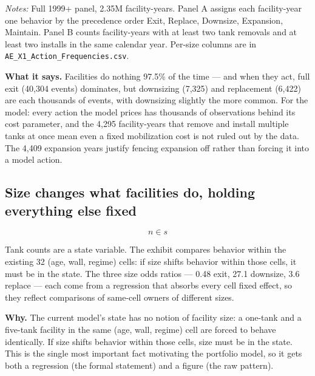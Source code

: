 \documentclass[
  letterpaper,
  DIV=11,
  numbers=noendperiod]{scrartcl}
\begin{document}
\begin{table}[H]
\centering
\caption{Facility-year behavior frequencies}

\par\vspace{4pt}
{\footnotesize\textit{Notes:} Full 1999+ panel, 2.35M facility-years. Panel A
assigns each facility-year one behavior by the precedence order Exit, Replace,
Downsize, Expansion, Maintain. Panel B counts facility-years with at least two
tank removals and at least two installs in the same calendar year. Per-size
columns are in \texttt{AE\_X1\_Action\_Frequencies.csv}.\par}
\end{table}

\textbf{What it says.} Facilities do nothing 97.5\% of the time --- and
when they act, full exit (40,304 events) dominates, but downsizing
(7,325) and replacement (6,422) are each thousands of events, with
downsizing slightly the more common. For the model: every action the
model prices has thousands of observations behind its cost parameter,
and the 4,295 facility-years that remove and install multiple tanks at
once mean even a fixed mobilization cost is not ruled out by the data.
The 4,409 expansion years justify fencing expansion off rather than
forcing it into a model action.

\subsection{Size changes what facilities do, holding everything else
fixed}\label{sec-ae-x2}

\[
n \in s
\]

Tank counts are a state variable. The exhibit compares behavior within
the existing 32 (age, wall, regime) cells: if size shifts behavior
within those cells, it must be in the state. The three size odds ratios
--- 0.48 exit, 27.1 downsize, 3.6 replace --- each come from a
regression that absorbs every cell fixed effect, so they reflect
comparisons of same-cell owners of different sizes.

\textbf{Why.} The current model's state has no notion of facility size:
a one-tank and a five-tank facility in the same (age, wall, regime) cell
are forced to behave identically. If size shifts behavior within those
cells, size must be in the state. This is the single most important fact
motivating the portfolio model, so it gets both a regression (the formal
statement) and a figure (the raw pattern).
\end{document}

